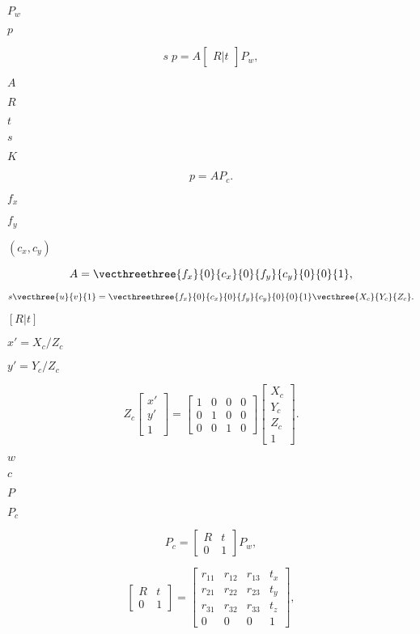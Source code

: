 \documentclass{article}
\begin{document}
$P_w$
\pagebreak

$p$
\pagebreak

\[s \; p = A \begin{bmatrix} R|t \end{bmatrix} P_w,\]
\pagebreak

$A$
\pagebreak

$R$
\pagebreak

$t$
\pagebreak

$s$
\pagebreak

$K$
\pagebreak

\[p = A P_c.\]
\pagebreak

$f_x$
\pagebreak

$f_y$
\pagebreak

$(c_x, c_y)$
\pagebreak

\[A = \vecthreethree{f_x}{0}{c_x}{0}{f_y}{c_y}{0}{0}{1},\]
\pagebreak

\[s \vecthree{u}{v}{1} = \vecthreethree{f_x}{0}{c_x}{0}{f_y}{c_y}{0}{0}{1} \vecthree{X_c}{Y_c}{Z_c}.\]
\pagebreak

$[R|t]$
\pagebreak

$x' = X_c / Z_c$
\pagebreak

$y' = Y_c / Z_c$
\pagebreak

\[Z_c \begin{bmatrix} x' \\ y' \\ 1 \end{bmatrix} = \begin{bmatrix} 1 & 0 & 0 & 0 \\ 0 & 1 & 0 & 0 \\ 0 & 0 & 1 & 0 \end{bmatrix} \begin{bmatrix} X_c \\ Y_c \\ Z_c \\ 1 \end{bmatrix}.\]
\pagebreak

$w$
\pagebreak

$c$
\pagebreak

$P$
\pagebreak

$P_c$
\pagebreak

\[P_c = \begin{bmatrix} R & t \\ 0 & 1 \end{bmatrix} P_w,\]
\pagebreak

\[\begin{bmatrix} R & t \\ 0 & 1 \end{bmatrix} = \begin{bmatrix} r_{11} & r_{12} & r_{13} & t_x \\ r_{21} & r_{22} & r_{23} & t_y \\ r_{31} & r_{32} & r_{33} & t_z \\ 0 & 0 & 0 & 1 \end{bmatrix}, \]
\pagebreak
\end{document}
